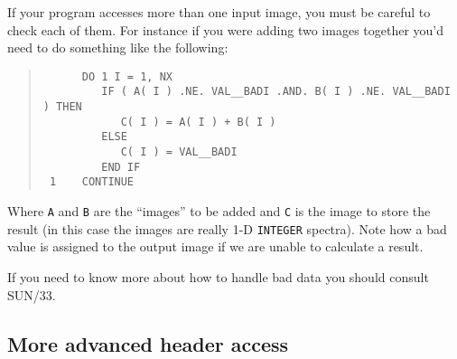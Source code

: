 \documentclass[twoside,11pt]{article}
\newcommand{\xref}[3]{#1}
\renewcommand{\_}{\texttt{\symbol{95}}}
\newcommand{\myverb}[1]{{\texttt{#1}}}
\newenvironment{code}{\begin{small} \begin{quote}}
                     {\end{quote} \end{small}}
\begin{document}
If your program accesses more than one input image, you must be
careful to check each of them. For instance if you were adding two
images together you'd need to do something like the following:
\begin{code}
\begin{verbatim}
      DO 1 I = 1, NX
         IF ( A( I ) .NE. VAL__BADI .AND. B( I ) .NE. VAL__BADI ) THEN
            C( I ) = A( I ) + B( I )
         ELSE
            C( I ) = VAL__BADI
         END IF
 1    CONTINUE
\end{verbatim}
\end{code}

Where \myverb{A} and \myverb{B} are the ``images'' to be added and
\myverb{C} is the image to store the result (in this case the images
are really 1-D \myverb{INTEGER} spectra).
Note how a bad value is assigned to the output image if we are unable
to calculate a result.

If you need to know more about how to handle bad data you should
consult \xref{SUN/33}{sun33}{bad_pixels}.

\subsection{More advanced header access}
\end{document}
